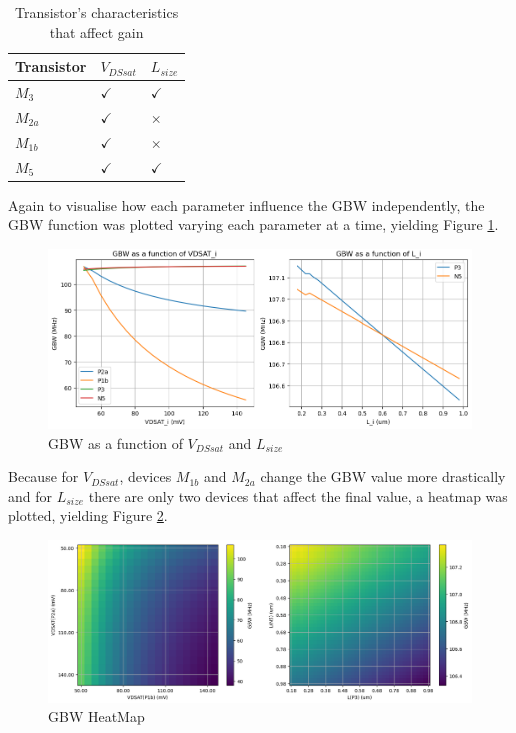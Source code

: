 
\begin{table}[h]
    \centering
    \caption{Transistor's characteristics that affect gain}
    \begin{tabularx}{\textwidth}{>{\centering\arraybackslash}X >{\centering\arraybackslash}X >{\centering\arraybackslash}X}
        \toprule
        \textbf{Transistor} & \textbf{$V_{DSsat}$} & \textbf{$L_{size}$} \\
        \midrule
        $M_{3}$ & $\checkmark$ & $\checkmark$\\
        \midrule
        $M_{2a}$ & $\checkmark$ & $\times$\\
        \midrule
        $M_{1b}$ & $\checkmark$ & $\times$\\
        \midrule
        $M_{5}$ & $\checkmark$ & $\checkmark$\\
        \bottomrule
    \end{tabularx}
    \label{tab:GBWTransistors}
\end{table}

Again to visualise how each parameter influence the GBW independently, the GBW function was plotted varying each parameter at a time, yielding Figure \ref{fig:GBWVariation}.

\begin{figure}[H]
    \centering
    \includegraphics[width=1\textwidth]{Images/GBWVariation.png}
    \caption{GBW as a function of $V_{DSsat}$ and $L_{size}$}
    \label{fig:GBWVariation}
\end{figure}

Because for $V_{DSsat}$, devices $M_{1b}$ and $M_{2a}$ change the GBW value more drastically and for $L_{size}$ there are only two devices that affect the final value, a heatmap was plotted, yielding Figure \ref{fig:GBWHeatMap}. 

\begin{figure}[H]
    \centering
    \includegraphics[width=1\textwidth]{Images/GBWHeatMap.png}
    \caption{GBW HeatMap}
    \label{fig:GBWHeatMap}
\end{figure}

